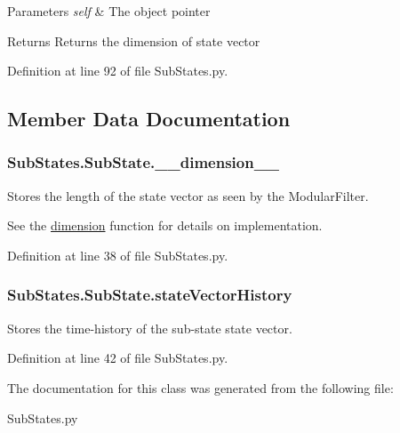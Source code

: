 \begin{DoxyParams}{Parameters}
{\em self} & The object pointer\\
\hline
\end{DoxyParams}
\begin{DoxyReturn}{Returns}
Returns the dimension of state vector 
\end{DoxyReturn}


Definition at line 92 of file Sub\+States.\+py.



\subsection{Member Data Documentation}
\subsubsection[{\texorpdfstring{\+\_\+\+\_\+dimension\+\_\+\+\_\+}{__dimension__}}]{\setlength{\rightskip}{0pt plus 5cm}Sub\+States.\+Sub\+State.\+\_\+\+\_\+dimension\+\_\+\+\_\+\hspace{0.3cm}{\ttfamily [private]}}\hypertarget{classSubStates_1_1SubState_aea750997b2a75daee4a3147eac68e4f8}{}\label{classSubStates_1_1SubState_aea750997b2a75daee4a3147eac68e4f8}


Stores the length of the state vector as seen by the Modular\+Filter. 

See the \hyperlink{classSubStates_1_1SubState_a4aebea19a134cb871a7c0b6c2709546a}{dimension} function for details on implementation. 

Definition at line 38 of file Sub\+States.\+py.

\subsubsection[{\texorpdfstring{state\+Vector\+History}{stateVectorHistory}}]{\setlength{\rightskip}{0pt plus 5cm}Sub\+States.\+Sub\+State.\+state\+Vector\+History}\hypertarget{classSubStates_1_1SubState_a24bf2de56fc3037d91cba43d28f3bf60}{}\label{classSubStates_1_1SubState_a24bf2de56fc3037d91cba43d28f3bf60}


Stores the time-\/history of the sub-\/state state vector. 



Definition at line 42 of file Sub\+States.\+py.



The documentation for this class was generated from the following file\+:\begin{DoxyCompactItemize}
\item 
Sub\+States.\+py\end{DoxyCompactItemize}
